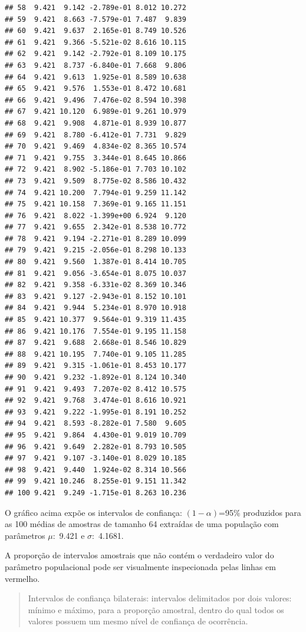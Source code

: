 \documentclass[
]{book}
\begin{document}
\begin{verbatim}
## 58  9.421  9.142 -2.789e-01 8.012 10.272
## 59  9.421  8.663 -7.579e-01 7.487  9.839
## 60  9.421  9.637  2.165e-01 8.749 10.526
## 61  9.421  9.366 -5.521e-02 8.616 10.115
## 62  9.421  9.142 -2.792e-01 8.109 10.175
## 63  9.421  8.737 -6.840e-01 7.668  9.806
## 64  9.421  9.613  1.925e-01 8.589 10.638
## 65  9.421  9.576  1.553e-01 8.472 10.681
## 66  9.421  9.496  7.476e-02 8.594 10.398
## 67  9.421 10.120  6.989e-01 9.261 10.979
## 68  9.421  9.908  4.871e-01 8.939 10.877
## 69  9.421  8.780 -6.412e-01 7.731  9.829
## 70  9.421  9.469  4.834e-02 8.365 10.574
## 71  9.421  9.755  3.344e-01 8.645 10.866
## 72  9.421  8.902 -5.186e-01 7.703 10.102
## 73  9.421  9.509  8.775e-02 8.586 10.432
## 74  9.421 10.200  7.794e-01 9.259 11.142
## 75  9.421 10.158  7.369e-01 9.165 11.151
## 76  9.421  8.022 -1.399e+00 6.924  9.120
## 77  9.421  9.655  2.342e-01 8.538 10.772
## 78  9.421  9.194 -2.271e-01 8.289 10.099
## 79  9.421  9.215 -2.056e-01 8.298 10.133
## 80  9.421  9.560  1.387e-01 8.414 10.705
## 81  9.421  9.056 -3.654e-01 8.075 10.037
## 82  9.421  9.358 -6.331e-02 8.369 10.346
## 83  9.421  9.127 -2.943e-01 8.152 10.101
## 84  9.421  9.944  5.234e-01 8.970 10.918
## 85  9.421 10.377  9.564e-01 9.319 11.435
## 86  9.421 10.176  7.554e-01 9.195 11.158
## 87  9.421  9.688  2.668e-01 8.546 10.829
## 88  9.421 10.195  7.740e-01 9.105 11.285
## 89  9.421  9.315 -1.061e-01 8.453 10.177
## 90  9.421  9.232 -1.892e-01 8.124 10.340
## 91  9.421  9.493  7.207e-02 8.412 10.575
## 92  9.421  9.768  3.474e-01 8.616 10.921
## 93  9.421  9.222 -1.995e-01 8.191 10.252
## 94  9.421  8.593 -8.282e-01 7.580  9.605
## 95  9.421  9.864  4.430e-01 9.019 10.709
## 96  9.421  9.649  2.282e-01 8.793 10.505
## 97  9.421  9.107 -3.140e-01 8.029 10.185
## 98  9.421  9.440  1.924e-02 8.314 10.566
## 99  9.421 10.246  8.255e-01 9.151 11.342
## 100 9.421  9.249 -1.715e-01 8.263 10.236
\end{verbatim}

\hfill\break

O gráfico acima expõe os intervalos de confiança: \((1-\alpha)\)=95\% produzidos para as 100 médias de amostras de tamanho 64 extraídas de uma população com parâmetros \(\mu:\) 9.421 e \(\sigma:\) 4.1681.

\hfill\break

A proporção de intervalos amostrais que não contém o verdadeiro valor do parâmetro populacional pode ser visualmente inspecionada pelas linhas em vermelho.

\hfill\break

\begin{quote}
Intervalos de confiança bilaterais: intervalos delimitados por dois valores: mínimo e máximo, para a proporção amostral, dentro do qual todos os valores possuem um mesmo nível de confiança de ocorrência.
\end{quote}
\end{document}
